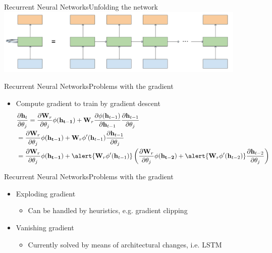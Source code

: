 \documentclass[handout]{beamer}
\theoremstyle{definition}
\theoremstyle{remark}
\newcommand*{\V}[1]{\mathbf{#1}}%
\begin{document}
\begin{frame}{Recurrent Neural Networks}{Unfolding the network}
  \centering
  \includegraphics[width=12cm]{figs/rnn.png}
\end{frame}

\begin{frame}{Recurrent Neural Networks}{Problems with the gradient}
  \begin{itemize}
      \item {Compute gradient to train by gradient descent\pause}
      \begin{align*}
          &\frac{\partial\V{h}_t}{\partial\theta_j} = \frac{\partial\V{W}_r}{\partial\theta_j} \phi(\V{h_{t-1}}) + \V{W}_r\frac{\partial \phi(\V{h}_{t-1})}{\partial\V{h}_{t-1}}\frac{\partial \V{h}_{t-1}}{\partial\theta_j}\\
    &= \frac{\partial\V{W}_r}{\partial\theta_j} \phi(\V{h_{t-1}}) + \V{W}_r\phi'(\V{h}_{t-1})\frac{\partial \V{h}_{t-1}}{\partial\theta_j}\\
    &= \frac{\partial\V{W}_r}{\partial\theta_j} \phi(\V{h_{t-1}}) + \alert{\V{W}_r\phi'(\V{h}_{t-1})}\left(\frac{\partial\V{W}_r}{\partial\theta_j} \phi(\V{h_{t-2}}) + \alert{\V{W}_r\phi'(\V{h}_{t-2})}\frac{\partial \V{h}_{t-2}}{\partial\theta_j}\right)
      \end{align*}
  \end{itemize}
\end{frame}

\begin{frame}{Recurrent Neural Networks}{Problems with the gradient}
  \begin{itemize}
      \item{Exploding gradient\pause
        \begin{itemize}
            \item{Can be handled by heuristics, e.g. gradient clipping\pause}
        \end{itemize}
      }
      \item{Vanishing gradient\pause
        \begin{itemize}
            \item{Currently solved by means of architectural changes, i.e. LSTM\pause}
        \end{itemize}
      }
      
  \end{itemize}
\end{frame}
\end{document}
